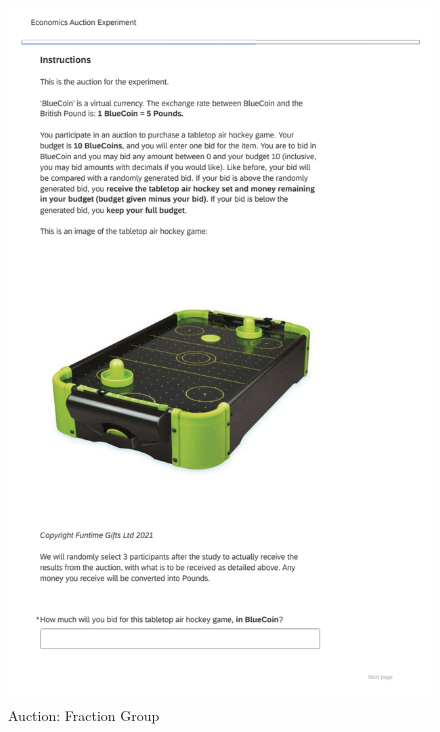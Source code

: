 \documentclass[
]{report}
\begin{document}
\begin{figure}[H]

{\centering \includegraphics{experiment_instructions/auction_fraction.png}

}

\caption{Auction: Fraction Group}

\end{figure}%
\end{document}
